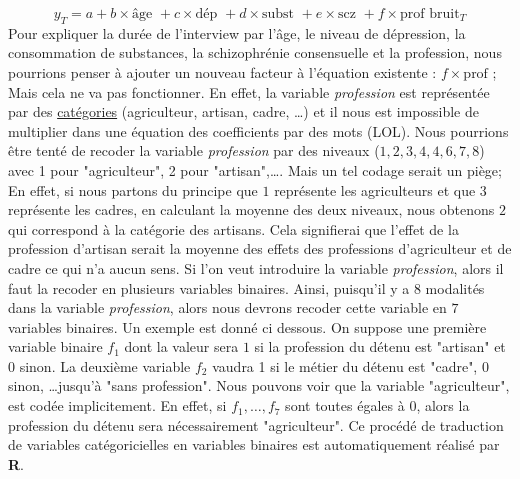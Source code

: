 $$ y_{T} = a + b\times \textrm{âge } + c\times \textrm{dép } + d\times\textrm{subst }  + e\times\textrm{scz } + f\times\textrm{prof } \textrm{bruit}_{T} $$ 
Pour expliquer la durée de l'interview par l'âge, le niveau de dépression, la consommation de substances, la schizophrénie consensuelle et la profession, nous pourrions penser à ajouter un nouveau facteur à l'équation existente : $f\times\textrm{prof }$; Mais cela ne va pas fonctionner.\newline
En effet, la variable \textit{profession} est représentée par des \underline{catégories} (agriculteur, artisan, cadre, \dots) et il nous est impossible de multiplier dans une équation des coefficients par des mots (LOL).\newline
Nous pourrions être tenté de recoder la variable \textit{profession} par des niveaux ($1,2,3,4,4,6,7,8$) avec 1 pour "agriculteur", 2 pour "artisan",\dots . Mais un tel codage serait un piège; En effet, si nous partons du principe que $1$ représente les agriculteurs et que $3$ représente les cadres, en calculant la moyenne des deux niveaux, nous obtenons $2$ qui correspond à la catégorie des artisans. Cela signifierai que l'effet de la profession d'artisan serait la moyenne des effets des professions d'agriculteur et de cadre ce qui n'a aucun sens.\newline
Si l'on veut introduire la variable \textit{profession}, alors il faut la recoder en plusieurs variables binaires. Ainsi, puisqu'il y a $8$ modalités dans la variable \textit{profession}, alors nous devrons recoder cette variable en $7$ variables binaires.\newline
Un exemple est donné ci dessous. On suppose une première variable binaire $f_{1}$ dont la valeur sera $1$  si la profession du détenu est "artisan" et $0$ sinon. La deuxième variable $f_{2}$ vaudra 1 si le métier du détenu est "cadre", 0 sinon, \dots  jusqu'à "sans profession".\newline
Nous pouvons voir que la variable "agriculteur", est codée implicitement. En effet, si $f_{1}, \dots , f_{7}$ sont toutes égales à $0$, alors la profession du détenu sera nécessairement "agriculteur".\newline
Ce procédé de traduction de variables catégoricielles en variables binaires est automatiquement réalisé par \textbf{R}.

